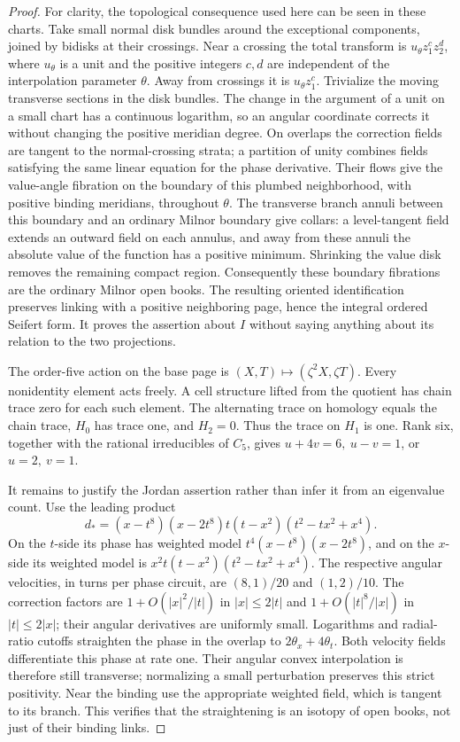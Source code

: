 \documentclass[11pt]{article}
\begin{document}
\begin{proof}
For clarity, the topological consequence used here can be seen in
these charts. Take small normal disk bundles around the exceptional
components, joined by bidisks at their crossings. Near a crossing
the total transform is \(u_\theta z_1^c z_2^d\), where \(u_\theta\)
is a unit and the positive integers \(c,d\) are independent of the
interpolation parameter \(\theta\). Away from crossings it is
\(u_\theta z_1^c\). Trivialize the moving transverse sections in
the disk bundles. The change in the argument of a unit on a small
chart has a continuous logarithm, so an angular coordinate corrects
it without changing the positive meridian degree. On overlaps the
correction fields are tangent to the normal-crossing strata; a
partition of unity combines fields satisfying the same linear
equation for the phase derivative. Their flows give the
value-angle fibration on the boundary of this plumbed neighborhood,
with positive binding meridians, throughout \(\theta\).
The transverse branch annuli between this boundary and an ordinary
Milnor boundary give collars: a level-tangent field extends an
outward field on each annulus, and away from these annuli the
absolute value of the function has a positive minimum.
Shrinking the value disk removes the remaining compact region.
Consequently these boundary fibrations are the ordinary Milnor
open books. The resulting oriented identification preserves linking
with a positive neighboring page, hence the integral ordered
Seifert form. It proves the assertion about \(I\) without saying
anything about its relation to the two projections.

The order-five action on the base page is
\((X,T)\mapsto(\zeta^2X,\zeta T)\). Every nonidentity element acts
freely. A cell structure lifted from the quotient has chain trace
zero for each such element. The alternating trace on homology
equals the chain trace, \(H_0\) has trace one, and \(H_2=0\).
Thus the trace on \(H_1\) is one. Rank six, together with the
rational irreducibles of \(C_5\), gives
\(u+4v=6,\ u-v=1\), or \(u=2,\ v=1\).

It remains to justify the Jordan assertion rather than infer it
from an eigenvalue count. Use the leading product
\[
 d_*=(x-t^8)(x-2t^8)t(t-x^2)(t^2-tx^2+x^4).
                                                               \tag{4}
\]
On the \(t\)-side its phase has weighted model
\(t^4(x-t^8)(x-2t^8)\), and on the \(x\)-side its weighted model
is \(x^2t(t-x^2)(t^2-tx^2+x^4)\).
The respective angular velocities, in turns per phase circuit, are
\((8,1)/20\) and \((1,2)/10\).
The correction factors are \(1+O(|x|^2/|t|)\) in
\(|x|\le2|t|\) and \(1+O(|t|^8/|x|)\) in \(|t|\le2|x|\);
their angular derivatives are uniformly small.
Logarithms and radial-ratio cutoffs straighten the phase in the
overlap to \(2\theta_x+4\theta_t\).
Both velocity fields differentiate this phase at rate one.
Their angular convex interpolation is therefore still transverse;
normalizing a small perturbation preserves this strict positivity.
Near the binding use the appropriate weighted field, which is
tangent to its branch. This verifies that the straightening is an
isotopy of open books, not just of their binding links.


\end{proof}
\end{document}
